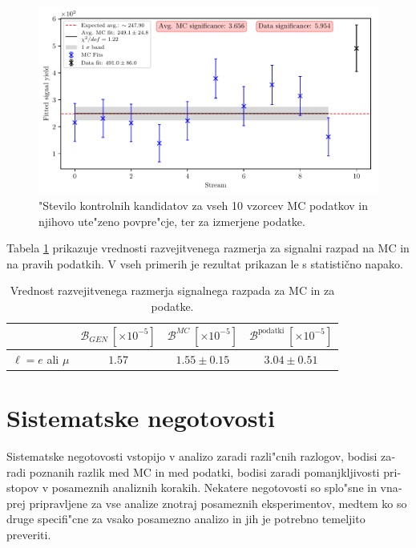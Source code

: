 \begin{otherlanguage}{slovene}
\begin{figure}[H]
	\centering
	\captionsetup{width=0.8\linewidth}
	\includegraphics[width=\linewidth]{fig/sig_global}
	\caption{"Stevilo kontrolnih kandidatov za vseh 10 vzorcev MC podatkov in njihovo ute"zeno povpre"cje, ter za izmerjene podatke.}
	\label{fig:sig_global_si}
\end{figure}

Tabela \ref{tab:br_result_sig_si} prikazuje vrednosti razvejitvenega razmerja za signalni razpad na MC in na pravih podatkih. V vseh primerih je rezultat prikazan le s statistično napako.

\begin{table}[H]
	\centering
	\begin{tabular}{l|c|c|c}
		& $\mathcal{B}_{GEN}~[\times 10^{-5}]$ & $\mathcal{B}^{MC}~[\times 10^{-5}]$ & $\mathcal{B}^{\mathrm{podatki}}~[\times 10^{-5}]$ \\
		\toprule
		$\ell = e$ ali $\mu$ & $1.57$ & $1.55 \pm 0.15$ & $3.04 \pm 0.51$\\
		\bottomrule
	\end{tabular}
	\captionsetup{width=.8\linewidth}
	\caption{Vrednost razvejitvenega razmerja signalnega razpada za MC in za podatke.}
\label{tab:br_result_sig_si}
\end{table}

\section{Sistematske negotovosti}

Sistematske negotovosti vstopijo v analizo zaradi razli"cnih razlogov, bodisi zaradi poznanih razlik med MC in med podatki, bodisi zaradi pomanjkljivosti pristopov v posameznih analiznih korakih. Nekatere negotovosti so splo"sne in vnaprej pripravljene za vse analize znotraj posameznih eksperimentov, medtem ko so druge specifi"cne za vsako posamezno analizo in jih je potrebno temeljito preveriti. 


\end{otherlanguage}

